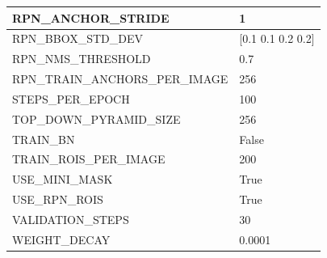 \begin{longtable}{|l|l|}
	RPN\_ANCHOR\_STRIDE             & 1                                                                                                                                                                                      \\ \hline
	RPN\_BBOX\_STD\_DEV             & {[}0.1 0.1 0.2 0.2{]}                                                                                                                                                                  \\ \hline
	RPN\_NMS\_THRESHOLD             & 0.7                                                                                                                                                                                    \\ \hline
	RPN\_TRAIN\_ANCHORS\_PER\_IMAGE & 256                                                                                                                                                                                    \\ \hline
	STEPS\_PER\_EPOCH               & 100                                                                                                                                                                                    \\ \hline
	TOP\_DOWN\_PYRAMID\_SIZE        & 256                                                                                                                                                                                    \\ \hline
	TRAIN\_BN                       & False                                                                                                                                                                                  \\ \hline
	TRAIN\_ROIS\_PER\_IMAGE         & 200                                                                                                                                                                                    \\ \hline
	USE\_MINI\_MASK                 & True                                                                                                                                                                                   \\ \hline
	USE\_RPN\_ROIS                  & True                                                                                                                                                                                   \\ \hline
	VALIDATION\_STEPS               & 30                                                                                                                                                                                     \\ \hline
	WEIGHT\_DECAY                   & 0.0001                                                                                                                                                                                 \\ \hline
\end{longtable}

